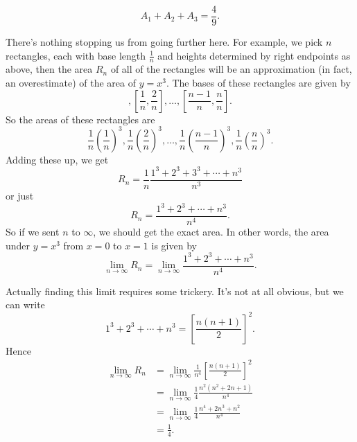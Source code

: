 \documentclass[10pt,]{book}
\numberwithin{equation}{section}
\begin{document}
\begin{equation*}
A_{1} + A_{2} + A_{3} = \frac{4}{9}.
\end{equation*}
%
\par
\hypertarget{p-405}{}%
There's nothing stopping us from going further here. For example, we pick \(n\) rectangles, each with base length \(\frac{1}{n}\) and heights determined by right endpoints as above, then the area \(R_{n}\) of all of the rectangles will be an approximation (in fact, an overestimate) of the area of \(y = x^{3}\). The bases of these rectangles are given by%
\begin{equation*}
[0,\frac{1}{n}], [\frac{1}{n},\frac{2}{n}],\ldots,[\frac{n-1}{n},\frac{n}{n}].
\end{equation*}
So the areas of these rectangles are%
\begin{equation*}
\frac{1}{n}\left(\frac{1}{n}\right)^{3}, \frac{1}{n}\left(\frac{2}{n}\right)^{3},\ldots,\frac{1}{n}\left(\frac{n-1}{n}\right)^{3}, \frac{1}{n}\left(\frac{n}{n}\right)^{3}.
\end{equation*}
Adding these up, we get%
\begin{equation*}
R_{n} = \frac{1}{n}\frac{1^{3}+2^{3} + 3^{3} + \cdots + n^{3}}{n^{3}}
\end{equation*}
or just%
\begin{equation*}
R_{n} = \frac{1^{3} + 2^{3} + \cdots + n^{3}}{n^{4}}.
\end{equation*}
So if we sent \(n\) to \(\infty\), we should get the exact area. In other words, the area under \(y=x^{3}\) from \(x=0\) to \(x=1\) is given by%
\begin{equation*}
\lim_{n\to\infty}R_{n} = \lim_{n\to\infty}\frac{1^{3} + 2^{3} + \cdots + n^{3}}{n^{4}}.
\end{equation*}
%
\par
\hypertarget{p-406}{}%
Actually finding this limit requires some trickery. It's not at all obvious, but we can write%
\begin{equation*}
1^{3} + 2^{3} + \cdots + n^{3} = \left[\frac{n(n+1)}{2}\right]^{2}.
\end{equation*}
Hence%
\begin{align*}
\lim_{n\to\infty}R_{n} & = \lim_{n\to\infty}\frac{1}{n^{4}}\left[\frac{n(n+1)}{2}\right]^{2} \\
& = \lim_{n\to\infty}\frac{1}{4}\frac{n^{2}(n^{2}+2n+1)}{n^{4}} \\
& = \lim_{n\to\infty}\frac{1}{4}\frac{n^{4} + 2n^{3} + n^{2}}{n^{4}} \\
& = \frac{1}{4}. 
\end{align*}
\end{document}
